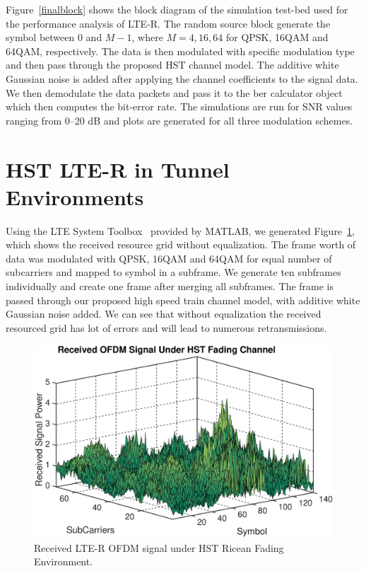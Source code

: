 Figure~\ref{finalblock} shows the block diagram of the simulation test-bed used for the performance analysis of LTE-R. The random source block generate the symbol between 0 and $M-1$, where $M = 4,16,64$ for QPSK, 16QAM and 64QAM, respectively. The data is then modulated with specific modulation type and then pass through the proposed HST channel model. The additive white Gaussian noise is added after applying the channel coefficients to the signal data. We then demodulate the data packets and pass it to the ber calculator object which then computes the bit-error rate. The simulations are run for SNR values ranging from 0--20 dB and plots are generated for all three modulation schemes.

\section{HST LTE-R in Tunnel Environments}
Using the LTE System Toolbox~\cite{ltetoolbox} provided by MATLAB, we generated Figure~\ref{lteofdma}, which shows the received resource grid without equalization. The frame worth of data was modulated with QPSK, 16QAM and 64QAM for equal number of subcarriers and mapped to symbol in a subframe. We generate ten subframes individually and create one frame after merging all subframes. The frame is passed through our proposed high speed train channel model, with additive white Gaussian noise added. We can see that without equalization the received resourced grid has lot of errors and will lead to numerous retransmissions.

\begin{figure}[!ht]
\centering
\includegraphics[width=\textwidth,keepaspectratio]{images/Gill/lte_figs/receivedsignal.eps} 
\caption{Received LTE-R OFDM signal under HST Ricean Fading Environment.}
\label{lteofdma}
\end{figure}

